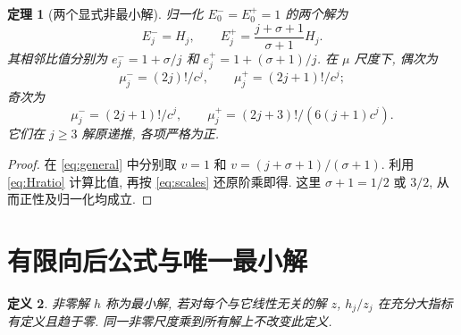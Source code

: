 \documentclass[UTF8]{ctexart}
\newtheorem{theorem}{定理}[section]
\newtheorem{definition}[theorem]{定义}
\newcommand{\sig}{\sigma}
\begin{document}
\begin{theorem}[两个显式非最小解]\label{thm:closed}
 归一化 $E_0^-=E_0^+=1$ 的两个解为
\[
 E_j^-=H_j,\qquad E_j^+=\frac{j+\sig+1}{\sig+1}H_j.
\]
 其相邻比值分别为 $e_j^-=1+\sig/j$ 和 $e_j^+=1+(\sig+1)/j$.
 在 $\mu$ 尺度下, 偶次为
\[
 \mu_j^-=(2j)!/c^j,\qquad \mu_j^+=(2j+1)!/c^j;
\]
 奇次为
\[
 \mu_j^-=(2j+1)!/c^j,\qquad \mu_j^+=(2j+3)!/(6(j+1)c^j).
\]
 它们在 $j\ge3$ 解原递推, 各项严格为正.
\end{theorem}
\begin{proof}
 在 \eqref{eq:general} 中分别取 $v=1$ 和 $v=(j+\sig+1)/(\sig+1)$.
 利用 \eqref{eq:Hratio} 计算比值, 再按 \eqref{eq:scales} 还原阶乘即得.
 这里 $\sig+1=1/2$ 或 $3/2$, 从而正性及归一化均成立.
\end{proof}

\section{有限向后公式与唯一最小解}

\begin{definition}
 非零解 $h$ 称为最小解, 若对每个与它线性无关的解 $z$,
 $h_j/z_j$ 在充分大指标有定义且趋于零.
 同一非零尺度乘到所有解上不改变此定义.
\end{definition}
\end{document}
